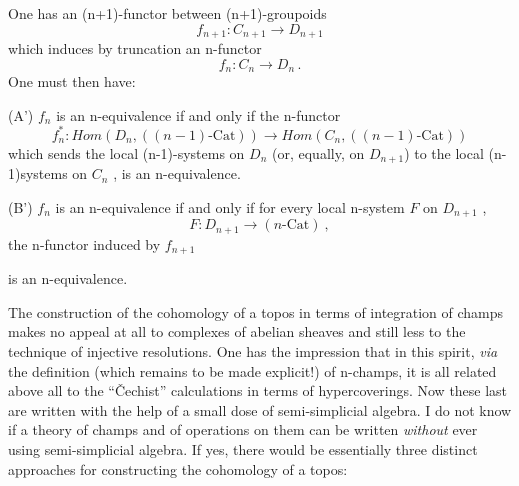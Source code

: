 \documentclass[11pt]{article}
\newcommand{\scanpage}[1]{\par\bigskip\noindent{\small\sffamily[scan #1]}\par}
\newcommand{\mspage}[1]{{\small\sffamily[p.\,#1]}}
\newcommand{\hand}[1]{\textcolor{blue}{#1}}
\newenvironment{diagramblock}{\par\begin{center}}{\end{center}\par}
\begin{document}
\mspage{\hand{126}}

\clearpage
\scanpage{134-2/126}
\mspage{- 5 -}

One has an (n+1)-functor between (n+1)-groupoids
\[ f_{n+1} : C_{n+1} \longrightarrow D_{n+1} \]
which induces by truncation an n-functor
\[ f_n : C_n \longrightarrow D_n \, . \]
One must then have:

(A') $f_n$ is an n-equivalence if and only if the n-functor
\[ f_n^{*} : \mathit{Hom}(D_n, ((n-1)\text{-Cat})) \longrightarrow \mathit{Hom}(C_n, ((n-1)\text{-Cat})) \]
which sends the local (n-1)-systems on $D_n$ (or, equally, on $D_{n+1}$)
to the local (n-1)systems on $C_n$ , is an n-equivalence.

(B') $f_n$ is an n-equivalence if and only if for every local n-system $F$
on $D_{n+1}$ ,
\[ F : D_{n+1} \longrightarrow (n\text{-Cat}) \ , \]
the n-functor induced by $f_{n+1}$
\begin{diagramblock}
\end{diagramblock}
is an n-equivalence.

The construction of the cohomology of a topos in terms of integration
of champs makes no appeal at all to complexes of abelian sheaves and still
less to the technique of injective resolutions. One has the impression that
in this spirit, \textit{via} the definition (which remains to be made explicit!) of
n-champs, it is all related above all to the ``\v{C}echist'' calculations in terms
of hypercoverings. Now these last are written with the help of a small dose
of semi-simplicial algebra. I do not know if a theory of champs and of
operations on them can be written \textit{without} ever using semi-simplicial algebra.
If yes, there would be essentially three distinct approaches for constructing
the cohomology of a topos:
\end{document}
